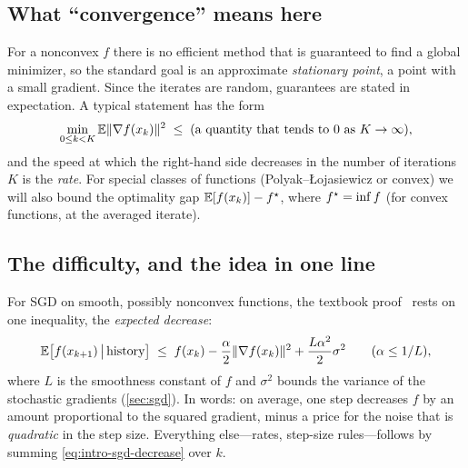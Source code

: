 \subsection{What ``convergence'' means here}

For a nonconvex $f$ there is no efficient method that is guaranteed to find a global
minimizer, so the standard goal is an approximate \emph{stationary point}, a point with a
small gradient. Since the iterates are random, guarantees are stated in expectation. A
typical statement has the form
\[
  \min_{0\le k<K}\mathbb{E}\lVert \nabla f(x_k)\rVert^2\;\le\;(\text{a quantity that tends to $0$ as
  $K\to\infty$}),
\]
and the speed at which the right-hand side decreases in the number of iterations $K$ is
the \emph{rate}. For special classes of functions (Polyak--{\L}ojasiewicz or convex) we
will also bound the optimality gap $\mathbb{E}[f(x_k)]-f^\star$, where $f^\star=\inf f$ (for convex
functions, at the averaged iterate).

\subsection{The difficulty, and the idea in one line}

For SGD on smooth, possibly nonconvex functions, the textbook
proof~\cite{bottou2018,ghadimilan2013} rests on one inequality,
the \emph{expected decrease}:
\begin{equation}\label{eq:intro-sgd-decrease}
  \mathbb{E}\bigl[f(x_{k+1})\,\big|\,\text{history}\bigr]\;\le\;f(x_k)
  -\frac{\alpha}{2}\lVert \nabla f(x_k)\rVert^2+\frac{L\alpha^2}{2}\sigma^2
  \qquad(\alpha\le 1/L),
\end{equation}
where $L$ is the smoothness constant of $f$ and $\sigma^2$ bounds the variance of the
stochastic gradients (\cref{sec:sgd}). In words: on average, one step decreases $f$ by an
amount proportional to the squared gradient, minus a price for the noise that is
\emph{quadratic} in the step size. Everything else---rates, step-size rules---follows by
summing \eqref{eq:intro-sgd-decrease} over $k$.

